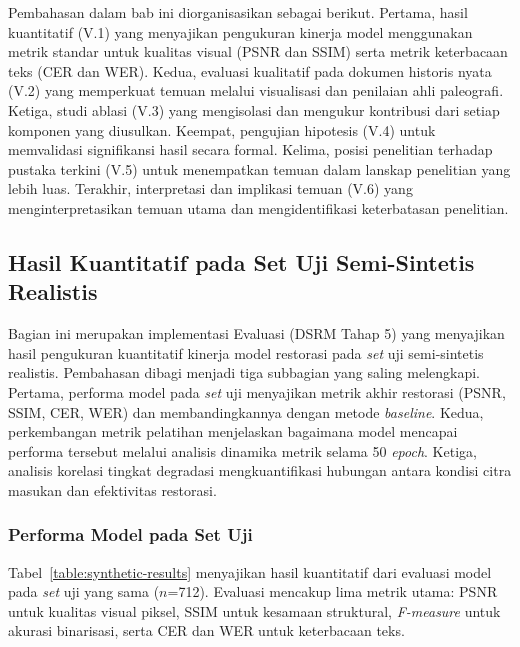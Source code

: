 \documentclass[12pt,a4paper]{article}
\begin{document}
Pembahasan dalam bab ini diorganisasikan sebagai berikut. Pertama, hasil kuantitatif (V.1) yang menyajikan pengukuran kinerja model menggunakan metrik standar untuk kualitas visual (PSNR dan SSIM) serta metrik keterbacaan teks (CER dan WER). Kedua, evaluasi kualitatif pada dokumen historis nyata (V.2) yang memperkuat temuan melalui visualisasi dan penilaian ahli paleografi. Ketiga, studi ablasi (V.3) yang mengisolasi dan mengukur kontribusi dari setiap komponen yang diusulkan. Keempat, pengujian hipotesis (V.4) untuk memvalidasi signifikansi hasil secara formal. Kelima, posisi penelitian terhadap pustaka terkini (V.5) untuk menempatkan temuan dalam lanskap penelitian yang lebih luas. Terakhir, interpretasi dan implikasi temuan (V.6) yang menginterpretasikan temuan utama dan mengidentifikasi keterbatasan penelitian.

\subsection{Hasil Kuantitatif pada Set Uji Semi-Sintetis Realistis}
\label{subsec:hasil-kuantitatif}

Bagian ini merupakan implementasi Evaluasi (DSRM Tahap 5) yang menyajikan hasil pengukuran kuantitatif kinerja model restorasi pada \textit{set} uji semi-sintetis realistis. Pembahasan dibagi menjadi tiga subbagian yang saling melengkapi. Pertama, performa model pada \textit{set} uji menyajikan metrik akhir restorasi (PSNR, SSIM, CER, WER) dan membandingkannya dengan metode \textit{baseline}. Kedua, perkembangan metrik pelatihan menjelaskan bagaimana model mencapai performa tersebut melalui analisis dinamika metrik selama 50 \textit{epoch}. Ketiga, analisis korelasi tingkat degradasi mengkuantifikasi hubungan antara kondisi citra masukan dan efektivitas restorasi.

\subsubsection{Performa Model pada Set Uji}
\label{subsubsec:performa-set-uji}

Tabel~\ref{table:synthetic-results} menyajikan hasil kuantitatif dari evaluasi model pada \textit{set} uji yang sama ($n$=712). Evaluasi mencakup lima metrik utama: PSNR untuk kualitas visual piksel, SSIM untuk kesamaan struktural, \textit{F-measure} untuk akurasi binarisasi, serta CER dan WER untuk keterbacaan teks.
\end{document}
